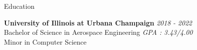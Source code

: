 \documentclass{resume} %
\begin{document}

    \begin{rSection}{Education}

        {\textbf{University of Illinois at Urbana Champaign}} \hfill {\em 2018 - 2022}\\
        Bachelor of Science in Aerospace Engineering \hfill {\em GPA : 3.43/4.00} \\
        Minor in Computer Science


    \end{rSection}
\end{document}
